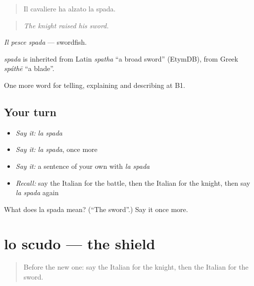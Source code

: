 \begin{quote}
Il cavaliere ha alzato la spada.
\end{quote}

\begin{quote}
\emph{The knight raised his sword.}
\end{quote}

\emph{Il pesce spada} — swordfish.

\begin{cousinweb}
\emph{spada} is inherited from Latin \emph{spatha} \textquotedblleft{}a broad sword\textquotedblright{} (EtymDB), from Greek \emph{spáthē} \textquotedblleft{}a blade\textquotedblright{}.
\end{cousinweb}

\begin{grammarlens}[title={What you've built}]
One more word for telling, explaining and describing at B1.
\end{grammarlens}

\subsection*{Your turn}
\begin{itemize}
\raggedright
  \item \emph{Say it:} \emph{la spada}
  \item \emph{Say it:} \emph{la spada}, once more
  \item \emph{Say it:} a sentence of your own with \emph{la spada}
  \item \emph{Recall:} say the Italian for the battle, then the Italian for the knight, then say \emph{la spada} again
\end{itemize}

\begin{tcolorbox}[breakable,colback=teal!4,colframe=teal!35!black,title={Before you move on}]
What does la spada mean? (\textquotedblleft{}The sword\textquotedblright{}.) Say it once more.
\end{tcolorbox}
\section[lo scudo]{lo scudo — the shield}

\label{lesson:IT-C327-scudo}



\begin{quote}
Before the new one: say the Italian for the knight, then the Italian for the sword.
\end{quote}

